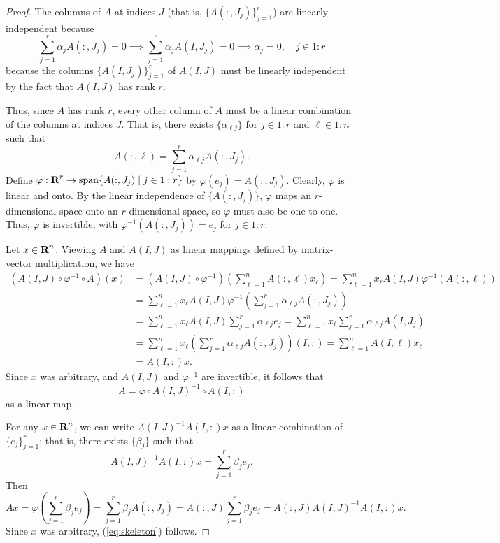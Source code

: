 \documentclass{article}
\begin{document}
	\begin{proof}
		The columns of $A$ at indices $J$ (that is, $\{A(:, J_j)\}_{j=1}^r$) are linearly independent because
		\begin{equation}
			\sum_{j=1}^r\alpha_j A(:, J_j) = 0 \implies \sum_{j=1}^r \alpha_j A(I, J_j) = 0 \implies\alpha_j = 0, \quad j \in 1:r
		\end{equation}
		because the columns $\{A(I,J_j)\}_{j=1}^r$ of $A(I,J)$ must be linearly independent by the fact that $A(I,J)$ has rank $r$.
		
		Thus, since $A$ has rank $r$, every other column of $A$ must be a linear combination of the columns at indices $J$. That is, there exists $\{\alpha_{\ell j}\}$ for $j \in 1:r$ and $\ell\in 1:n$ such that
		\begin{equation}
			A(:, \ell) = \sum_{j=1}^r \alpha_{\ell j} A(:, J_j).
		\end{equation}
		Define $\varphi : \textnormal{\bf R}^r \to \mathrm{span}\{A(:, J_j) \mid j \in 1:r\}$ by $\varphi(e_j) = A(:,J_j)$. Clearly, $\varphi$ is linear and onto. By the linear independence of $\{A(:,J_j)\}$, $\varphi$ maps an $r$-dimensional space onto an $r$-dimensional space, so $\varphi$ must also be one-to-one. Thus, $\varphi$ is invertible, with $\varphi^{-1}(A(:, J_j)) = e_j$ for $j \in 1:r$.
		
		Let $x \in \textnormal{\bf R}^n$. Viewing $A$ and $A(I,J)$ as linear mappings defined by matrix-vector multiplication, we have
		\begin{align}
			(A(I,J)\circ \varphi^{-1} \circ A)(x) &= (A(I,J)\circ\varphi^{-1})\left(\sum_{\ell=1}^nA(:, \ell)x_\ell\right) = \sum_{\ell=1}^nx_\ell A(I,J)\varphi^{-1}(A(:,\ell)) \\
			&=\sum_{\ell=1}^nx_\ell A(I,J)\varphi^{-1}\left(\sum_{j=1}^r\alpha_{\ell j}A(:,J_j)\right)\\
			&=\sum_{\ell=1}^nx_\ell A(I,J)\sum_{j=1}^r\alpha_{\ell j} e_j =\sum_{\ell=1}^nx_\ell \sum_{j=1}^r\alpha_{\ell j}A(I, J_j)\\
			&= \sum_{\ell=1}^nx_\ell\left(\sum_{j=1}^r\alpha_{\ell j}A(:,J_j)\right)(I,:) = \sum_{\ell=1}^n A(I, \ell) x_\ell \\
			&= A(I, :)x.
		\end{align}
		Since $x$ was arbitrary, and $A(I,J)$ and $\varphi^{-1}$ are invertible, it follows that
		\begin{equation}
			A = \varphi \circ A(I,J)^{-1}\circ A(I,:)
		\end{equation}
		as a linear map. 
		
		For any $x \in \textnormal{\bf R}^n$, we can write $A(I,J)^{-1}A(I,:)x$ as a linear combination of $\{e_j\}_{j=1}^r$; that is, there exists $\{\beta_j\}$ such that
		\begin{equation}
			A(I,J)^{-1}A(I,:)x = \sum_{j=1}^r\beta_j e_j.
		\end{equation}
		Then
		\begin{equation}
			Ax = \varphi\left(\sum_{j=1}^r\beta_je_j\right) = \sum_{j=1}^r\beta_j A(:,J_j) = A(:,J)\sum_{j=1}^r\beta_je_j = A(:,J)A(I,J)^{-1}A(I,:)x.
		\end{equation}
		Since $x$ was arbitrary, (\ref{eq:skeleton}) follows.
	\end{proof}
	
\end{document}

